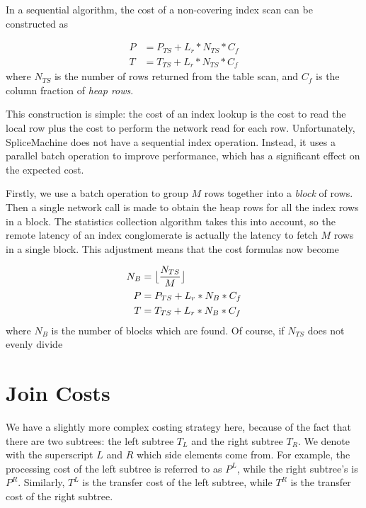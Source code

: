 \documentclass[10pt]{amsart}
\DeclarePairedDelimiter{\floor}{\lfloor}{\rfloor}
\begin{document}
In a sequential algorithm, the cost of a non-covering index scan can be constructed as

\begin{equation}
				\begin{aligned}
								P	&= P_{TS}+L_r*N_{TS}*C_f \\
								T &= T_{TS} + L_r*N_{TS}*C_f
				\end{aligned}
\end{equation}
where $N_{TS}$ is the number of rows returned from the table scan, and $C_f$ is the column fraction of \emph{heap rows}. 

This construction is simple: the cost of an index lookup is the cost to read the local row plus the cost to perform the network read for each row. Unfortunately, SpliceMachine does not have a sequential index operation. Instead, it uses a parallel batch operation to improve performance, which has a significant effect on the expected cost.

Firstly, we use a batch operation to group $M$ rows together into a \emph{block} of rows. Then a single network call is made to obtain the heap rows for all the index rows in a block. The statistics collection algorithm takes this into account, so the remote latency of an index conglomerate is actually the latency to fetch $M$ rows in a single block. This adjustment means that the cost formulas now become

\begin{equation}
				\begin{aligned}
								N_B &= \floor[\big]{\frac{N_{TS}}{M}} \\
								P &= P_{TS} + L_r*N_B*C_f \\
								T &= T_{TS} + L_r*N_B*C_f
				\end{aligned}
\end{equation}
where $N_B$ is the number of blocks which are found. Of course, if $N_{TS}$ does not evenly divide


\section{Join Costs}
We have a slightly more complex costing strategy here, because of the fact that there are two subtrees: the left subtree $T_L$ and the right subtree $T_R$. We denote with the superscript $L$ and $R$ which side elements come from. For example, the processing cost of the left subtree is referred to as $P^L$, while the right subtree's is $P^R$. Similarly, $T^L$ is the transfer cost of the left subtree, while $T^R$ is the transfer cost of the right subtree.
\end{document}
